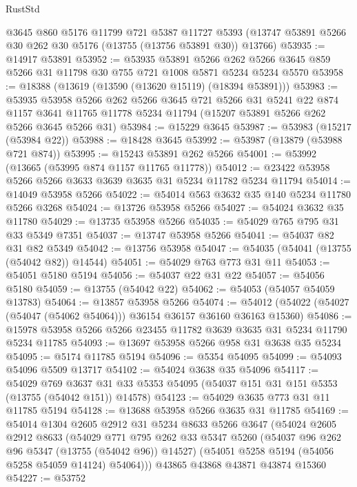 \begin{lexlean}{RustStd}
\begin{coremodule}
    @3645
    @860
    @5176
    @11799
    @721
    @5387
    @11727
    @5393
    (@13747 @53891 @5266 @30 @262 @30 @5176 (@13755 (@13756 @53891 @30)) @13766)
@53935 := @14917 @53891
@53952 := @53935
    @53891
    @5266
    @262
    @5266
    @3645
    @859
    @5266
    @31
    @11798
    @30
    @755
    @721
    @1008
    @5871
    @5234
    @5234
    @5570
@53958 := @18388 (@13619 (@13590 (@13620 @15119) (@18394 @53891)))
@53983 := @53935
    @53958
    @5266
    @262
    @5266
    @3645
    @721
    @5266
    @31
    @5241
    @22
    @874
    @1157
    @3641
    @11765
    @11778
    @5234
    @11794
    (@15207 @53891 @5266 @262 @5266 @3645 @5266 @31)
@53984 := @15229 @3645
@53987 := @53983 (@15217 (@53984 @22))
@53988 := @18428 @3645
@53992 := @53987 (@13879 (@53988 @721 @874))
@53995 := @15243 @53891 @262 @5266
@54001 := @53992 (@13665 (@53995 @874 @1157 @11765 @11778))
@54012 := @23422 @53958 @5266 @5266 @3633 @3639 @3635 @31 @5234 @11782 @5234 @11794
@54014 := @14049 @53958 @5266
@54022 := @54014 @563 @3632 @35 @140 @5234 @11780 @5266 @3268
@54024 := @13726 @53958 @5266
@54027 := @54024 @3632 @35 @11780
@54029 := @13735 @53958 @5266
@54035 := @54029 @765 @795 @31 @33 @5349 @7351
@54037 := @13747 @53958 @5266
@54041 := @54037 @82 @31 @82 @5349
@54042 := @13756 @53958
@54047 := @54035 (@54041 (@13755 (@54042 @82)) @14544)
@54051 := @54029 @763 @773 @31 @11
@54053 := @54051 @5180 @5194
@54056 := @54037 @22 @31 @22
@54057 := @54056 @5180
@54059 := @13755 (@54042 @22)
@54062 := @54053 (@54057 @54059 @13783)
@54064 := @13857 @53958 @5266
@54074 := @54012 (@54022 (@54027 (@54047 (@54062 @54064))) @36154 @36157 @36160 @36163 @15360)
@54086 := @15978 @53958 @5266 @5266 @23455 @11782 @3639 @3635 @31 @5234 @11790 @5234 @11785
@54093 := @13697 @53958 @5266 @958 @31 @3638 @35 @5234
@54095 := @5174 @11785 @5194
@54096 := @5354 @54095
@54099 := @54093 @54096 @5509 @13717
@54102 := @54024 @3638 @35 @54096
@54117 := @54029
    @769
    @3637
    @31
    @33
    @5353
    @54095
    (@54037 @151 @31 @151 @5353 (@13755 (@54042 @151)) @14578)
@54123 := @54029 @3635 @773 @31 @11 @11785 @5194
@54128 := @13688 @53958 @5266 @3635 @31 @11785
@54169 := @54014
    @1304
    @2605
    @2912
    @31
    @5234
    @8633
    @5266
    @3647
    (@54024
      @2605
      @2912
      @8633
      (@54029
        @771
        @795
        @262
        @33
        @5347
        @5260
        (@54037 @96 @262 @96 @5347 (@13755 (@54042 @96)) @14527)
        (@54051 @5258 @5194 (@54056 @5258 @54059 @14124) @54064)))
    @43865
    @43868
    @43871
    @43874
    @15360
@54227 := @53752

\end{coremodule}
\end{lexlean}
